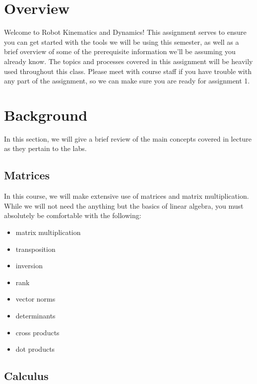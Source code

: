 \documentclass{16384_doc}
\begin{document}
\maketitle

\tableofcontents

\section{Overview}
Welcome to Robot Kinematics and Dynamics!  This assignment serves to
ensure you can get started with the tools we will be using this semester, as
well as a brief overview of some of the prerequisite information we'll be
assuming you already know.  The topics and processes covered in this assignment
will be heavily used throughout this class.  Please meet with course staff if
you have trouble with any part of the assignment, so we can make sure you
are ready for assignment 1.

\section{Background}

In this section, we will give a brief review of the main concepts
covered in lecture as they pertain to the labs. 

\subsection{Matrices}

In this course, we will make extensive use of matrices and matrix multiplication.
While we will not need the anything but the basics of linear algebra, you must
absolutely be comfortable with the following:

\begin{itemize}
    \item matrix multiplication
    \item transposition
    \item inversion
    \item rank
    \item vector norms
    \item determinants
    \item cross products
    \item dot products
\end{itemize}

\subsection{Calculus}
\end{document}
